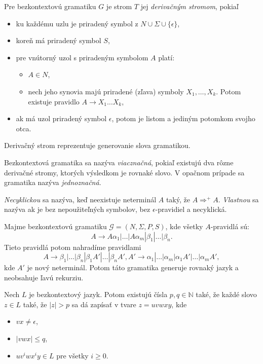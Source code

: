 \begin{definition}
	Pre bezkontextovú gramatiku $G$ je strom $T$ jej 
	{\em derivačným stromom}, pokiaľ 
	\begin{itemize}
		\item ku každému uzlu je priradený symbol z $N \cup \Sigma \cup \{ \epsilon \}$,
		\item koreň má priradený symbol $S$,
		\item pre vnútorný uzol s priradeným symbolom $A$ platí:
		\begin{itemize}
			\item $A \in N$,
			\item nech jeho synovia majú priradené (zľava) symboly $X_1, \ldots, X_k$. Potom existuje pravidlo $A \to X_1\ldots X_k$,
		\end{itemize}
		\item ak má uzol priradený symbol $\epsilon$, potom je listom a jediným potomkom svojho otca.
	\end{itemize}
\end{definition}

Derivačný strom reprezentuje generovanie slova gramatikou.

Bezkontextová gramatika sa nazýva {\em viacznačná}, pokiaľ
existujú dva rôzne derivačné stromy, ktorých výsledkom je rovnaké slovo.
V opačnom prípade sa gramatika nazýva {\em jednoznačná}.

{\em Necyklickou} sa nazýva, keď neexistuje neterminál $A$ taký,
že $A \Rightarrow^+ A$. {\em Vlastnou} sa nazýva ak je bez nepoužiteľných symbolov,
bez $\epsilon$-pravidiel a necyklická.

\begin{lemma}
	Majme bezkontextovú gramatiku $\mathcal{G}=(N, \Sigma, P, S)$,
	kde všetky $A$-pravidlá sú:
	\[
		A \to A\alpha_1|\ldots|A\alpha_m|\beta_1|\ldots|\beta_n.
	\]
	Tieto pravidlá potom nahradíme pravidlami
	\[
		A \to \beta_1|\ldots|\beta_n|\beta_1A'|\ldots|\beta_nA', A' \to \alpha_1|\ldots|\alpha_m|\alpha_1A'|\ldots|\alpha_mA',
	\]
	kde $A'$ je nový neterminál. Potom táto gramatika generuje
	rovnaký jazyk a neobsahuje ľavú rekurziu.
\end{lemma}

\begin{theorem}
	Nech $L$ je bezkontextový jazyk. Potom existujú čísla $p,q \in \mathbb{N}$
	také, že každé slovo $z \in L$ také, že $|z| > p$ sa dá
	zapísať v tvare $z=uvwxy$, kde
	\begin{itemize}
		\item $vx \neq \epsilon$,
		\item $|vwx| \leq q$,
		\item $uv^iwx^iy \in L$ pre všetky $i \geq 0$.
	\end{itemize}
\end{theorem}


